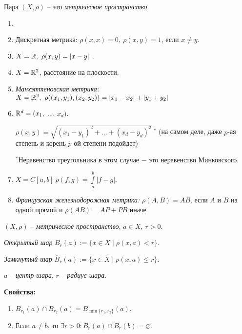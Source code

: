 \begin{definition}
    Пара $(X, \rho)$ – это \textit{метрическое пространство}.
\end{definition}

\begin{example}
    \begin{enumerate}
        \item[]
        \item Дискретная метрика: $\rho(x, x)=0,\ \rho(x, y)=1$, если $x\neq y$.
        \item $X=\mathbb{R},\ \rho(x, y)=|x-y|$ .
        \item $X=\mathbb{R}^2$, расстояние на плоскости.
        \item \textit{Манхэттеновская метрика:} $X=\mathbb{R}^2,\ \rho((x_1, y_1), (x_2, y_2))=|x_1-x_2|+|y_1+y_2|$
        \item $\mathbb{R}^d=(x_1,$ ..., $x_d)$.

        $\rho(x, y)=\sqrt{(x_1-y_1)^2+...+(x_d-y_d)^2}\ ^*$ (на самом деле, даже $p$-ая степень и корень $p$-ой степени подойдет)

        $^*$Неравенство треугольника в этом случае $-$ это неравенство Минковского. 
        \item $X=C[a, b] \ \rho(f, g)=\int\limits_a^b |f-g|$.
        \item \textit{Французская железнодорожная метрика:} $\rho(A, B)=AB$, если $A$ и $B$ на одной прямой и $\rho(AB)=AP+PB$ иначе.
    \end{enumerate}
\end{example}

\begin{definition}
    $(X, \rho)$ – \textit{метрическое пространство}, $a\in X,\ r>0$.

    \textit{Открытый шар} $B_r(a):=\{x\in X\mid \rho(x, a)<r\}$.

    \textit{Замкнутый шар} $\overline{B}_r(a):=\{x\in X\mid \rho(x, a)\leq r\}$.

    $a$ – \textit{центр шара}, $r$ – \textit{радиус шара}.
\end{definition}

\begin{statement} \textbf{Свойства:}
    \begin{enumerate}
        \item $B_{r_1}(a)\cap B_{r_2}(a)=B_{\min\{r_1, r_2\}}(a)$.
        \item Если $a\neq b$, то $\exists r>0:\overline{B}_r(a)\cap \overline{B}_r(b)=\varnothing$.
    \end{enumerate}
\end{statement}

